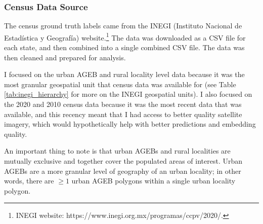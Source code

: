 \documentclass[12pt,letterpaper]{article}
\begin{document}
\subsubsection{Census Data Source}

The census ground truth labels came from the INEGI (Instituto Nacional de Estadística y Geografía) website.\footnote{INEGI website: https://www.inegi.org.mx/programas/ccpv/2020/.} The data was downloaded as a CSV file for each state, and then combined into a single combined CSV file. The data was then cleaned and prepared for analysis.

I focused on the urban AGEB and rural locality level data because it was the most granular geospatial unit that census data was available for (see Table \ref{tab:inegi_hierarchy} for more on the INEGI geospatial units). I also focused on the 2020 and 2010 census data because it was the most recent data that was available, and this recency meant that I had access to better quality satellite imagery, which would hypothetically help with better predictions and embedding quality. 

An important thing to note is that urban AGEBs and rural localities are mutually exclusive and together cover the populated areas of interest. Urban AGEBs are a more granular level of geography of an urban locality; in other words, there are $\ge 1$ urban AGEB polygons within a single urban locality polygon.
\end{document}

